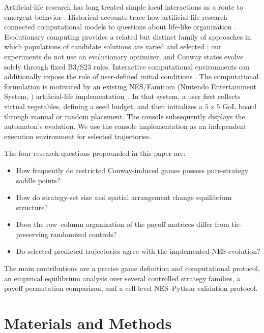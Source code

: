 \documentclass[games,article,submit,moreauthors]{Definitions/mdpi}
\begin{document}
Artificial-life research has long treated simple local interactions as a route to emergent behavior \citep{langton1989artificial,ilachinski2001cellular}. Historical accounts trace how artificial-life research connected computational models to questions about life-like organization \citep{levy1992}. Evolutionary computing provides a related but distinct family of approaches in which populations of candidate solutions are varied and selected \citep{eiben2015evolutionary}; our experiments do not use an evolutionary optimizer, and Conway states evolve solely through fixed B3/S23 rules. Interactive computational environments can additionally expose the role of user-defined initial conditions \citep{resnick2001turtles}. The computational formulation is motivated by an existing NES/Famicom (Nintendo Entertainment System, \citep{altice2015}) artificial-life implementation~\citep{senzio2026nes}. In that system, a user first collects virtual vegetables, defining a seed budget, and then initializes a $5\times5$ GoL board through manual or random placement. The console subsequently displays the automaton's evolution. 
We use the console implementation as an independent execution environment for selected trajectories.

The four research questions propounded in this paper are: 
\begin{itemize}
  \item 
  How frequently do restricted Conway-induced games possess pure-strategy saddle points?
  \item 
  How do strategy-set size and spatial arrangement change equilibrium structure?
  \item 
  Does the row--column organization of the payoff matrices differ from tie-preserving randomized controls?
  \item 
  Do selected predicted trajectories agree with the implemented NES evolution? 
\end{itemize}
The main contributions are 
a precise game definition and computational protocol, 
an empirical equilibrium analysis over several controlled strategy families, 
a payoff-permutation comparison, and 
a cell-level NES--Python validation protocol. 

\section{Materials and Methods}\label{sec:methods}
\end{document}
